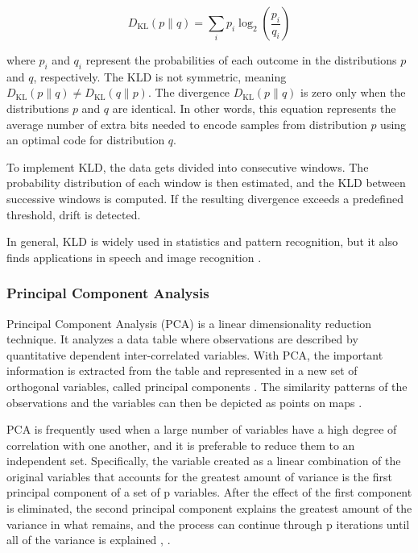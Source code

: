 \begin{equation}
D_{\text{KL}}(p \parallel q) = \sum_i p_i \log_2 \left( \frac{p_i}{q_i} \right)
\end{equation}

where \( p_i \) and \( q_i \) represent the probabilities of each outcome in the distributions \( p \) and \( q \), respectively. The KLD is not symmetric, meaning \( D_{\text{KL}}(p \parallel q) \neq D_{\text{KL}}(q \parallel p) \). The divergence \( D_{\text{KL}}(p \parallel q) \) is zero only when the distributions \( p \) and \( q \) are identical. In other words, this equation represents the average number of extra bits needed to encode samples from distribution \( p \) using an optimal code for distribution \( q \). 

To implement KLD, the data gets divided into consecutive windows. The probability distribution of each window is then estimated, and the KLD between successive windows is computed. If the resulting divergence exceeds a predefined threshold, drift is detected.

In general, KLD is widely used in statistics and pattern recognition, but it also finds applications in speech and image recognition \cite{hershey2007approximating}.

\subsubsection{Principal Component Analysis}

Principal Component Analysis (PCA) is a linear dimensionality reduction technique. It analyzes a data table where observations are described by quantitative dependent inter-correlated variables. With PCA, the important information is extracted from the table and represented in a new set of orthogonal variables, called principal components \cite{bro2014principal}. The similarity patterns of the observations and the variables can then be depicted as points on maps \cite{abdi2010principal}.

PCA is frequently used when a large number of variables have a high degree of correlation with one another, and it is preferable to reduce them to an independent set. Specifically, the variable created as a linear combination of the original variables that accounts for the greatest amount of variance is the first principal component of a set of p variables. After the effect of the first component is eliminated, the second principal component explains the greatest amount of the variance in what remains, and the process can continue through p iterations until all of the variance is explained \cite{jolliffe2016principal}, \cite{shao2014prototype}.

